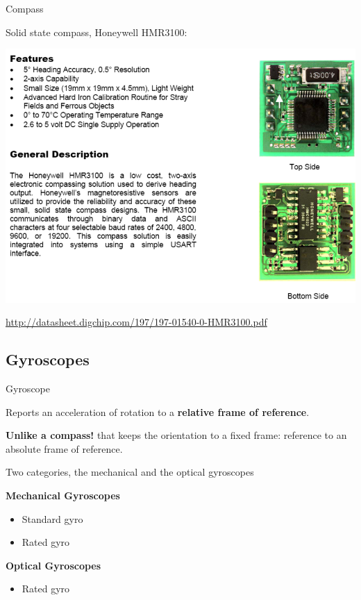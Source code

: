 \documentclass[compress]{beamer}
\begin{document}
\begin{frame}{Compass}

    Solid state compass, \eg Honeywell HMR3100:

    \begin{center}
        \includegraphics[width=0.8\linewidth]{compass}
    \end{center}
    \small
    \url{http://datasheet.digchip.com/197/197-01540-0-HMR3100.pdf}

\end{frame}

\subsection{Gyroscopes}

\begin{frame}{Gyroscope}

    Reports an acceleration of rotation to a \textbf{relative frame of reference}.

    \textbf{Unlike a compass!} that keeps the orientation to a fixed frame: reference to an
    absolute frame of reference.

    \pause

    Two categories, the mechanical and the optical gyroscopes

    {\bf Mechanical Gyroscopes}

    \begin{itemize}
        \item Standard gyro
        \item Rated gyro
    \end{itemize}

    {\bf Optical Gyroscopes}

    \begin{itemize}
        \item Rated gyro
    \end{itemize}

\end{frame}
\end{document}
